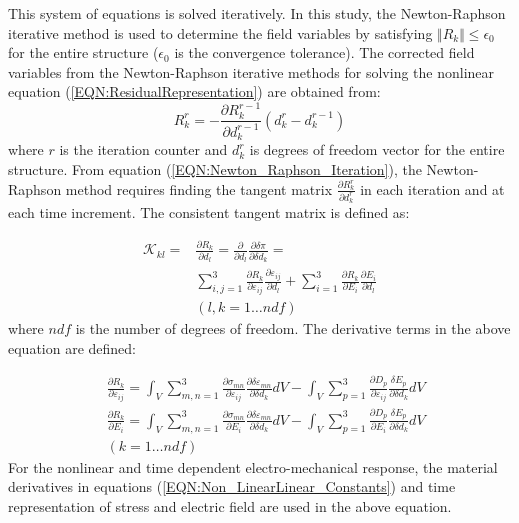 This system of equations is solved iteratively.  
In this study, the Newton-Raphson iterative method is used to determine the field variables by satisfying $\Vert R_k \Vert \leq \epsilon_0$ for the entire structure ($\epsilon_0$ is the convergence tolerance).
The corrected field variables from the Newton-Raphson iterative methods for solving the nonlinear equation (\ref{EQN:ResidualRepresentation}) are obtained from:
\begin{equation}
R_k^{r}=- \frac{\partial R_k^{r-1}}{\partial d_k^{r-1}} (d_k^{r}-d_k^{r-1})
\label{EQN:Newton_Raphson_Iteration}
\end{equation}
where $r$ is the iteration counter and $d_k^{r}$ is degrees of freedom vector for the entire structure. 
From equation (\ref{EQN:Newton_Raphson_Iteration}), the Newton-Raphson method requires finding the tangent matrix $\frac{\partial R_k^{r}}{\partial d_k^{r}}$ in each iteration and at each time increment. 
The consistent tangent matrix is defined as:

\begin{equation}
\begin{aligned}
\mathcal{K}_{kl}=
& \frac{\partial R_k}{\partial d_l}= 
\frac{\partial}{\partial d_l} \frac{\partial \delta \pi}{\partial \delta d_k}= \\
& \sum_{i,j=1}^3 \frac{\partial R_k}{\partial \varepsilon_{ij}}\frac{\partial \varepsilon_{ij}}{\partial d_l}+  
 \sum_{i=1}^3 \frac{\partial R_k}{\partial E_{i}}\frac{\partial E_{i}}{\partial d_l}\\ 
& (l,k=1\dots ndf)
\end{aligned}
\label{EQN:TangentRepresentation}
\end{equation}  
where $ndf$ is the number of degrees of freedom.
The derivative terms in the above equation are defined:

\begin{equation}
\begin{aligned}
&\frac{\partial R_k}{\partial \varepsilon_{ij}}=
\int_V  
\sum_{m,n=1}^3 \frac{\partial \sigma_{mn}}{\partial \varepsilon_{ij}} \frac{\partial \delta \varepsilon_{mn}}{\partial \delta d_k}  dV-
\int_V 
\sum_{p=1}^3 \frac{\partial D_{p}}{\partial \varepsilon_{ij}}  \frac{\delta E_{p}}{\partial \delta d_k} dV  \\
&\frac{\partial R_k}{\partial E_{i}}=
\int_V  
\sum_{m,n=1}^3 \frac{\partial \sigma_{mn}}{\partial E_{i}} \frac{\partial \delta \varepsilon_{mn}}{\partial \delta d_k}  dV-
\int_V 
\sum_{p=1}^3 \frac{\partial D_{p}}{\partial E_{i}}  \frac{\delta E_{p}}{\partial \delta d_k} dV  \\
& (k=1\dots ndf)
\end{aligned}
\label{EQN:StressExplcitTangent}
\end{equation}
For the nonlinear and time dependent electro-mechanical  response, the material
derivatives in equations (\ref{EQN:Non_LinearLinear_Constants}) 
and time representation of stress and electric field are used in the above equation.

